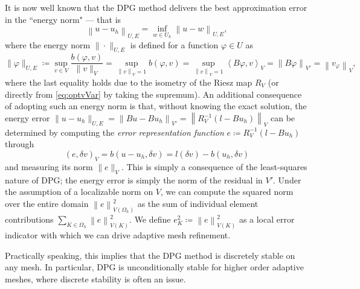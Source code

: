 \documentclass[11pt,onecolumn]{scrartcl}
\newcommand{\eqnlab}[1]{\label{eq:#1}}
\newcommand{\eqnref}[1]{\eqref{eq:#1}}
\newcommand{\nor}[1]{\left\| #1 \right\|}
\newcommand{\LRp}[1]{\left( #1 \right)}
\newcommand{\LRa}[1]{\left\langle #1 \right\rangle}
\newcommand{\Oh}{\Omega_h}
\begin{document}
It is now well known that the DPG method delivers the best approximation error in the ``energy norm" --- that is \cite{Bui-ThanhDemkowiczGhattas11a, DPG2,DPG4} 
\begin{equation}
\eqnlab{optimalError}
\nor{u-u_h}_{U,E} = \inf_{w\in U_h} \nor{u-w}_{U,E},
\end{equation}
where the energy norm $\|\cdot \|_{U,E}$ is defined for a function $\varphi \in U$ as
\begin{equation}
\eqnlab{energyNorm} \|\varphi\|_{U,E} \coloneqq \sup_{v\in V}
\frac{b(\varphi,v)}{\|v\|_V} = \sup_{\nor{v}_V = 1} b(\varphi,v) =
\sup_{\nor{v}_V = 1} \LRa{B\varphi,v}_V = \nor{B\varphi}_{V'} =
\nor{v_\varphi}_V,
\end{equation}
where the last equality holds due to the isometry of the Riesz map
$R_V$ (or directly from \eqnref{optvVar} by taking the supremum). An
additional consequence of adopting such an energy norm is that,
without knowing the exact solution, the energy error $\|u-u_h\|_{U,E}  = \nor{Bu - Bu_h}_{V'} = \nor{R_V^{-1}\LRp{l-Bu_h}}_{V}$ can
be determined by computing the \textit{error representation function} $e \coloneqq R_V^{-1}\LRp{l-Bu_h}$ through
\[
\left(e,\delta v\right)_V = b(u-u_h,\delta v) = l\LRp{\delta v} - b(u_h,\delta v)
\]
and measuring its norm $\|e\|_V$.  This is simply a consequence of the least-squares nature of DPG; the energy error is simply the norm of the residual in $V'$.  Under the assumption of a localizable norm on $V$, we can compute the squared norm over the entire domain $\nor{e}_{V(\Oh)}^2$ as the sum of individual element contributions $\sum_{K\in \Oh} \nor{e}_{V(K)}^2$.  We define $e_K^2 \coloneqq \nor{e}_{V(K)}^2$ as a local error indicator with which we can drive adaptive mesh refinement.  

Practically speaking, this implies that the DPG method is discretely stable on any mesh. In particular, DPG is unconditionally stable for higher order adaptive meshes, where discrete stability is often an issue. 
\end{document}
